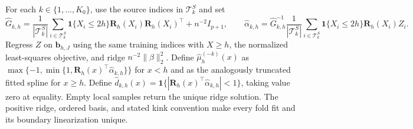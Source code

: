 For each \(k\in\{1,\ldots,K_0\}\), use the source indices in \(\mathcal T^S_k\) and set \[\widehat G_{k,h}=\frac1{|\mathcal T^S_k|}\sum_{i\in\mathcal T^S_k}\mathbf 1\{X_i\le2h\}\mathbf R_h(X_i)\mathbf R_h(X_i)^\top+n^{-2}I_{p+1},\qquad \widehat\alpha_{k,h}=\widehat G_{k,h}^{-1}\frac1{|\mathcal T^S_k|}\sum_{i\in\mathcal T^S_k}\mathbf 1\{X_i\le2h\}\mathbf R_h(X_i)Z_i.\] Regress \(Z\) on \(\mathbf b_{h,J}\) using the same training indices with \(X\ge h\), the normalized least-squares objective, and ridge \(n^{-2}\|\beta\|_2^2\). Define \(\widehat\mu_h^{(-k)}(x)\) as \(\max\{-1,\min\{1,\mathbf R_h(x)^\top\widehat\alpha_{k,h}\}\}\) for \(x<h\) and as the analogously truncated fitted spline for \(x\ge h\). Define \(\widehat d_{k,h}(x)=\mathbf 1\{|\mathbf R_h(x)^\top\widehat\alpha_{k,h}|<1\}\), taking value zero at equality. Empty local samples return the unique ridge solution. The positive ridge, ordered basis, and stated kink convention make every fold fit and its boundary linearization unique.